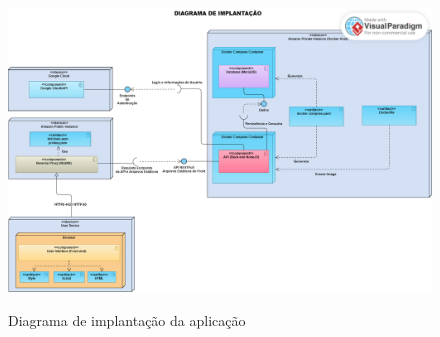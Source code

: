 \begin{figure}[htb]
  \centering
  \caption{Diagrama de implantação da aplicação}
  \includegraphics[width=\textwidth]{cap04-desenvolvimento/images/4-3-2-2-diagrama-implantacao}
  \label{fig:diagrama-implantacao}
\end{figure}
\FloatBarrier

